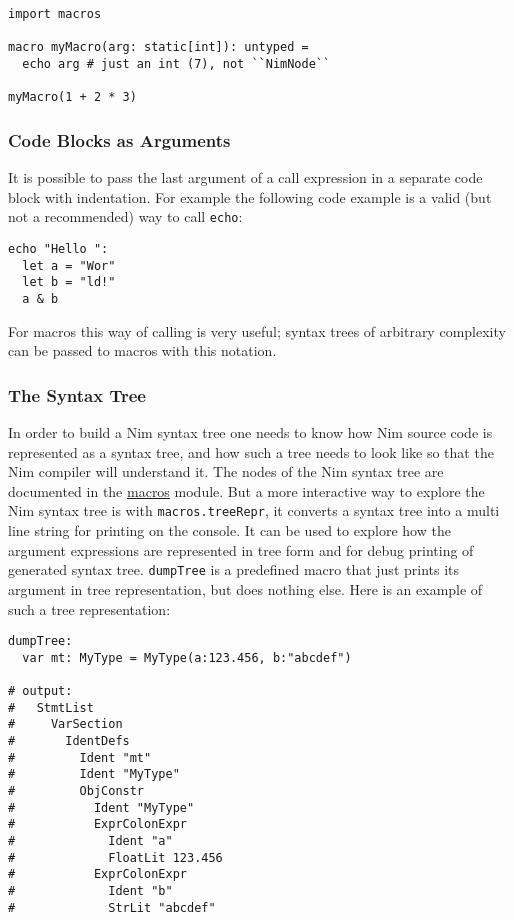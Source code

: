 \begin{verbatim}
import macros

macro myMacro(arg: static[int]): untyped =
  echo arg # just an int (7), not ``NimNode``

myMacro(1 + 2 * 3)
\end{verbatim}

\hypertarget{code-blocks-as-arguments}{%
\subsubsection{Code Blocks as
Arguments}\label{code-blocks-as-arguments}}

It is possible to pass the last argument of a call expression in a
separate code block with indentation. For example the following code
example is a valid (but not a recommended) way to call \texttt{echo}:

\begin{verbatim}
echo "Hello ":
  let a = "Wor"
  let b = "ld!"
  a & b
\end{verbatim}

For macros this way of calling is very useful; syntax trees of arbitrary
complexity can be passed to macros with this notation.

\hypertarget{the-syntax-tree}{%
\subsubsection{The Syntax Tree}\label{the-syntax-tree}}

In order to build a Nim syntax tree one needs to know how Nim source
code is represented as a syntax tree, and how such a tree needs to look
like so that the Nim compiler will understand it. The nodes of the Nim
syntax tree are documented in the \href{macros.html}{macros} module. But
a more interactive way to explore the Nim syntax tree is with
\texttt{macros.treeRepr}, it converts a syntax tree into a multi line
string for printing on the console. It can be used to explore how the
argument expressions are represented in tree form and for debug printing
of generated syntax tree. \texttt{dumpTree} is a predefined macro that
just prints its argument in tree representation, but does nothing else.
Here is an example of such a tree representation:

\begin{verbatim}
dumpTree:
  var mt: MyType = MyType(a:123.456, b:"abcdef")

# output:
#   StmtList
#     VarSection
#       IdentDefs
#         Ident "mt"
#         Ident "MyType"
#         ObjConstr
#           Ident "MyType"
#           ExprColonExpr
#             Ident "a"
#             FloatLit 123.456
#           ExprColonExpr
#             Ident "b"
#             StrLit "abcdef"
\end{verbatim}

